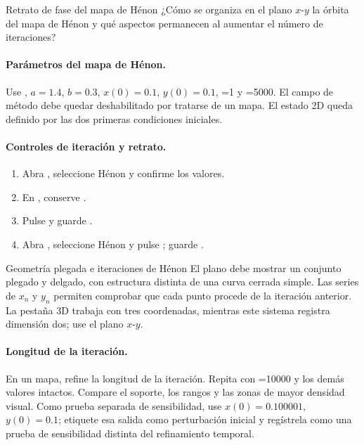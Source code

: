 \begin{cajaazul}{Retrato de fase del mapa de Hénon}
¿Cómo se organiza en el plano \(x\)-\(y\) la órbita del mapa de Hénon y qué
aspectos permanecen al aumentar el número de iteraciones?
\end{cajaazul}

\paragraph{Parámetros del mapa de Hénon.}
Use , \(a=1.4\), \(b=0.3\),
\(x(0)=0.1\), \(y(0)=0.1\), =1 y
=5000. El campo de método debe quedar deshabilitado por
tratarse de un mapa. El estado 2D queda definido por las dos primeras condiciones iniciales.

\paragraph{Controles de iteración y retrato.}
\begin{enumerate}
  \item Abra , seleccione Hénon y confirme los valores.
  \item En , conserve .
  \item Pulse  y guarde
  .
  \item Abra , seleccione Hénon y pulse
  ; guarde
  .
\end{enumerate}

\begin{cajaverde}{Geometría plegada e iteraciones de Hénon}
El plano debe mostrar un conjunto plegado y delgado, con estructura distinta de una curva
cerrada simple. Las series de \(x_n\) y \(y_n\) permiten comprobar que cada
punto procede de la iteración anterior. La pestaña 3D trabaja con tres
coordenadas, mientras este sistema registra dimensión dos; use el plano \(x\)-\(y\).
\end{cajaverde}


\paragraph{Longitud de la iteración.}
En un mapa, refine la longitud de la iteración. Repita con
=10000 y los demás valores intactos. Compare el soporte,
los rangos y las zonas de mayor densidad visual. Como prueba separada de
sensibilidad, use \(x(0)=0.100001\), \(y(0)=0.1\); etiquete esa salida como
perturbación inicial y regístrela como una prueba de sensibilidad distinta del refinamiento temporal.

